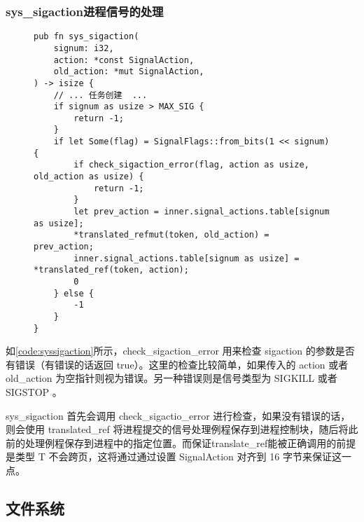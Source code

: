 \subsubsection{sys\_sigaction进程信号的处理}
\begin{figure}[h]
\begin{lstlisting}[caption=sys\_sigaction的系统调用, label=code:syssigaction]
pub fn sys_sigaction(
    signum: i32,
    action: *const SignalAction,
    old_action: *mut SignalAction,
) -> isize {
    // ... 任务创建  ...
    if signum as usize > MAX_SIG {
        return -1;
    }
    if let Some(flag) = SignalFlags::from_bits(1 << signum) {
        if check_sigaction_error(flag, action as usize, old_action as usize) {
            return -1;
        }
        let prev_action = inner.signal_actions.table[signum as usize];
        *translated_refmut(token, old_action) = prev_action;
        inner.signal_actions.table[signum as usize] = *translated_ref(token, action);
        0
    } else {
        -1
    }
}
\end{lstlisting}
\end{figure}

如\autoref{code:syssigaction}所示，check\_sigaction\_error 用来检查 sigaction 的参数是否有错误（有错误的话返回 true）。这里的检查比较简单，如果传入的 action 或者 old\_action 为空指针则视为错误。另一种错误则是信号类型为 SIGKILL 或者 SIGSTOP 。

sys\_sigaction 首先会调用 check\_sigactio\_error 进行检查，如果没有错误的话，则会使用 translated\_ref 将进程提交的信号处理例程保存到进程控制块，随后将此前的处理例程保存到进程中的指定位置。而保证translate\_ref能被正确调用的前提是类型 T 不会跨页，这将通过通过设置 SignalAction 对齐到 16 字节来保证这一点。

\subsection{文件系统}

